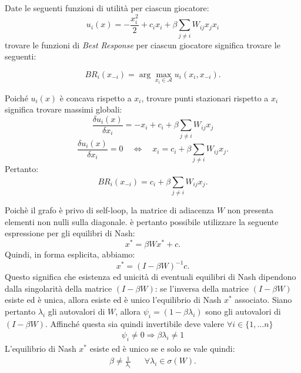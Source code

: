 \begin{alphaparts}
   \questionpart
   Date le seguenti funzioni di utilità per ciascun giocatore:
   \[
    u_i(x)=- \frac{x_i^2}{2}+ c_i x_i + \beta \sum\limits_{j \neq i} W_{ij}x_j x_i 
    \]
    trovare le funzioni di \textit{Best Response} per ciascun giocatore significa trovare le seguenti:

    \[BR_i(x_{ - i}) = \arg\max_{x_i \in \mathcal{A}} u_i(x_i, x_{ - i}).\]

    Poiché \(u_i(x)\) è concava rispetto a \(x_i\), trovare punti stazionari rispetto a \(x_i\) significa trovare massimi globali:
    \[
        \frac{\delta u_i ( x )}{\delta x_i} = -x_i + c_i + \beta  \sum \limits_{j \neq i}^{} W_{ij} x_j
    \]
    \[
        \frac{\delta u_i ( x )}{\delta x_i} = 0 \quad \iff \quad x_i = c_i + \beta  \sum \limits_{j \neq i}^{} W_{ij} x_j
    .\]
    Pertanto:
    \[
        BR_i(x_{-i}) = c_i + \beta  \sum \limits_{j \neq i}^{} W_{ij}x_j 
    .\]

    \questionpart
    Poichè il grafo è privo di self-loop, la matrice di adiacenza \(W\) non presenta elementi non nulli sulla diagonale. è pertanto possibile utilizzare la seguente espressione per gli equilibri di Nash:
    \begin{equation}\label{eq_nash}
        x^* = \beta W x^* + c
    .\end{equation}
    Quindi, in forma esplicita, abbiamo:
    \begin{equation*}
        x^* = (I -\beta W)^{-1} c
    .\end{equation*}
    Questo significa che esistenza ed unicità di eventuali equilibri di Nash dipendono dalla singolarità della matrice \((I - \beta W)\): se l'inversa della matrice \((I - \beta W)\) esiste ed è unica, allora esiste ed è unico l'equilibrio di Nash \(x^*\) associato. Siano pertanto \(\lambda_i\) gli autovalori di \(W\), allora \(\psi_i = (1 - \beta \lambda_i)\) sono gli autovalori di \((I-\beta W)\). Affinché questa sia quindi invertibile deve valere \(\forall i \in \{1, \dots n\}\) 
    \begin{gather*}
      \psi_i \neq 0 \Rightarrow \beta \lambda_i \neq 1
    \end{gather*}
    L'equilibrio di Nash \(x^*\) esiste ed è unico se e solo se vale quindi:
    \begin{align*}
      \beta \neq \frac{1}{\lambda_i} && \forall \lambda_i \in \sigma(W).
    \end{align*} 



\end{alphaparts}
